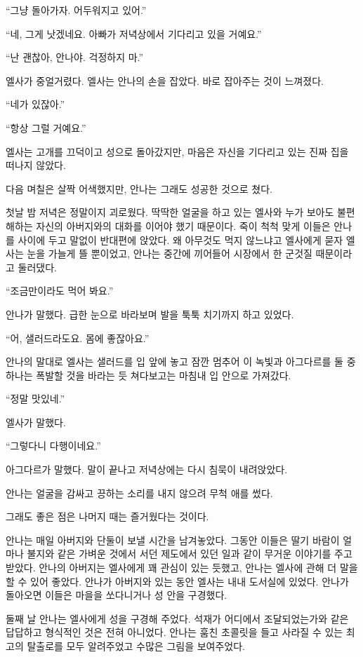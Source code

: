 ``그냥 돌아가자. 어두워지고 있어.''

``네, 그게 낫겠네요. 아빠가 저녁상에서 기다리고 있을 거예요.''

``난 괜찮아, 안나야. 걱정하지 마.''

엘사가 중얼거렸다. 엘사는 안나의 손을 잡았다. 바로 잡아주는 것이 느껴졌다.

``네가 있잖아.''

``항상 그럴 거예요.''

엘사는 고개를 끄덕이고 성으로 돌아갔지만, 마음은 자신을 기다리고 있는 진짜 집을 떠나지 않았다.

\textbreak

다음 며칠은 살짝 어색했지만, 안나는 그래도 성공한 것으로 쳤다.

첫날 밤 저녁은 정말이지 괴로웠다. 딱딱한 얼굴을 하고 있는 엘사와 누가 보아도 불편해하는 자신의 아버지와의 대화를 이어야 했기 때문이다. 죽이 척척 맞게 이들은 안나를 사이에 두고 말없이 반대편에 앉았다. 왜 아무것도 먹지 않느냐고 엘사에게 묻자 엘사는 눈을 가늘게 뜰 뿐이었고, 안나는 중간에 끼어들어 시장에서 한 군것질 때문이라고 둘러댔다.

``조금만이라도 먹어 봐요.''

안나가 말했다. 급한 눈으로 바라보며 발을 툭툭 치기까지 하고 있었다.

``어, 샐러드라도요. 몸에 좋잖아요.''

안나의 말대로 엘사는 샐러드를 입 앞에 놓고 잠깐 멈추어 이 녹빛과 아그다르를 둘 중 하나는 폭발할 것을 바라는 듯 쳐다보고는 마침내 입 안으로 가져갔다.

``정말 맛있네.''

엘사가 말했다.

``그렇다니 다행이네요.''

아그다르가 말했다. 말이 끝나고 저녁상에는 다시 침묵이 내려앉았다.

안나는 얼굴을 감싸고 끙하는 소리를 내지 않으려 무척 애를 썼다.

그래도 좋은 점은 나머지 때는 즐거웠다는 것이다.

안나는 매일 아버지와 단둘이 보낼 시간을 남겨놓았다. 그동안 이들은 딸기 바람이 얼마나 불지와 같은 가벼운 것에서 서던 제도에서 있던 일과 같이 무거운 이야기를 주고받았다. 안나의 아버지는 엘사에게 꽤 관심이 있는 듯했고, 안나는 엘사에 관해 더 말을 할 수 있어 좋았다. 안나가 아버지와 있는 동안 엘사는 내내 도서실에 있었다. 안나가 돌아오면 이들은 마을을 쏘다니거나 성 안을 구경했다.

둘째 날 안나는 엘사에게 성을 구경해 주었다. 석재가 어디에서 조달되었는가와 같은 답답하고 형식적인 것은 전혀 아니었다. 안나는 훔친 초콜릿을 들고 사라질 수 있는 최고의 탈출로를 모두 알려주었고 수많은 그림을 보여주었다.

